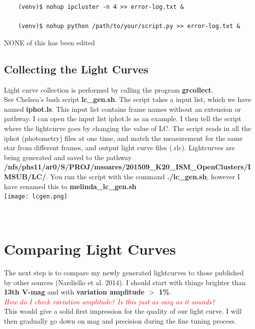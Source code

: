 \begin{verbatim}
    (venv)$ nohup ipcluster -n 4 >> error-log.txt &

    (venv)$ nohup python /path/to/your/script.py >> error-log.txt &
\end{verbatim}


\Huge{NONE of this has been edited}
\subsection*{Collecting the Light Curves}
Light curve collection is performed by calling the program \textbf{grcollect}. \\
See Chelsea's bash script \textbf{lc\_gen.sh}. 
The script takes a input list, which we have named \textbf{iphot.ls}. This input list contains frame names without an extension or pathway.
I can open the input list iphot.ls as an example. 
I then tell the script where the lightcurve goes by changing the value of LC.
The script reads in all the iphot (photometry) files at one time, and match the measurement for the same star from different frames, and output light curve files (.rlc).
Lightcurves are being generated and saved to the pathway \textbf{/nfs/phs11/ar0/S/PROJ/msoares/201509\_K20\_ISM\_OpenClusters/IMSUB/LC/}.
You run the script with the command \textbf{./lc\_gen.sh}, however I have renamed this to \textbf{melinda\_lc\_gen.sh}\\
\texttt{[image: lcgen.png]}\\
\\ \\ 

\section*{Comparing Light Curves}
The next step is to compare my newly generated lightcurves to those published by other sources (Nardiello et al. 2014). 
I should start with things brighter than \textbf{13th V-mag} and with \textbf{variation amplitude $>$ 1\%}.\\ \textcolor{red}{\textit{How do I check variation amplitude? Is this just as easy as it sounds?}}\\
This would give a solid first impression for the quality of our light curve. 
I will then gradually go down on mag and precision during the fine tuning process. 

